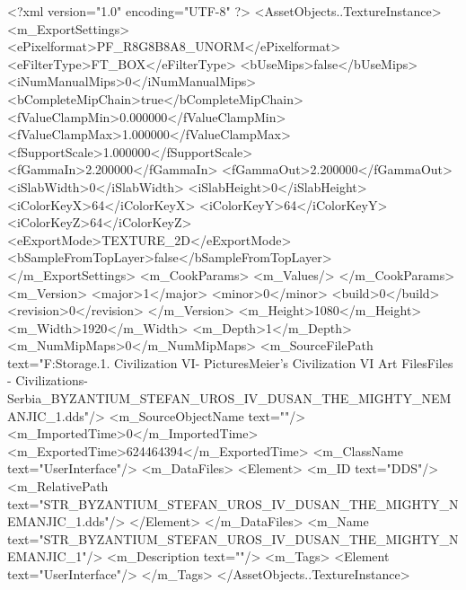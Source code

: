 <?xml version="1.0" encoding="UTF-8" ?>
<AssetObjects..TextureInstance>
	<m_ExportSettings>
		<ePixelformat>PF_R8G8B8A8_UNORM</ePixelformat>
		<eFilterType>FT_BOX</eFilterType>
		<bUseMips>false</bUseMips>
		<iNumManualMips>0</iNumManualMips>
		<bCompleteMipChain>true</bCompleteMipChain>
		<fValueClampMin>0.000000</fValueClampMin>
		<fValueClampMax>1.000000</fValueClampMax>
		<fSupportScale>1.000000</fSupportScale>
		<fGammaIn>2.200000</fGammaIn>
		<fGammaOut>2.200000</fGammaOut>
		<iSlabWidth>0</iSlabWidth>
		<iSlabHeight>0</iSlabHeight>
		<iColorKeyX>64</iColorKeyX>
		<iColorKeyY>64</iColorKeyY>
		<iColorKeyZ>64</iColorKeyZ>
		<eExportMode>TEXTURE_2D</eExportMode>
		<bSampleFromTopLayer>false</bSampleFromTopLayer>
	</m_ExportSettings>
	<m_CookParams>
		<m_Values/>
	</m_CookParams>
	<m_Version>
		<major>1</major>
		<minor>0</minor>
		<build>0</build>
		<revision>0</revision>
	</m_Version>
	<m_Height>1080</m_Height>
	<m_Width>1920</m_Width>
	<m_Depth>1</m_Depth>
	<m_NumMipMaps>0</m_NumMipMaps>
	<m_SourceFilePath text="F:\Mod Storage\2.1. Civilization VI\Mods\Archive - Pictures\Sid Meier's Civilization VI Art Files\Art Files - Civilizations\Civilization - Serbia\STR_BYZANTIUM_STEFAN_UROS_IV_DUSAN_THE_MIGHTY_NEMANJIC_1.dds"/>
	<m_SourceObjectName text=""/>
	<m_ImportedTime>0</m_ImportedTime>
	<m_ExportedTime>624464394</m_ExportedTime>
	<m_ClassName text="UserInterface"/>
	<m_DataFiles>
		<Element>
			<m_ID text="DDS"/>
			<m_RelativePath text="STR_BYZANTIUM_STEFAN_UROS_IV_DUSAN_THE_MIGHTY_NEMANJIC_1.dds"/>
		</Element>
	</m_DataFiles>
	<m_Name text="STR_BYZANTIUM_STEFAN_UROS_IV_DUSAN_THE_MIGHTY_NEMANJIC_1"/>
	<m_Description text=""/>
	<m_Tags>
		<Element text="UserInterface"/>
	</m_Tags>
</AssetObjects..TextureInstance>

